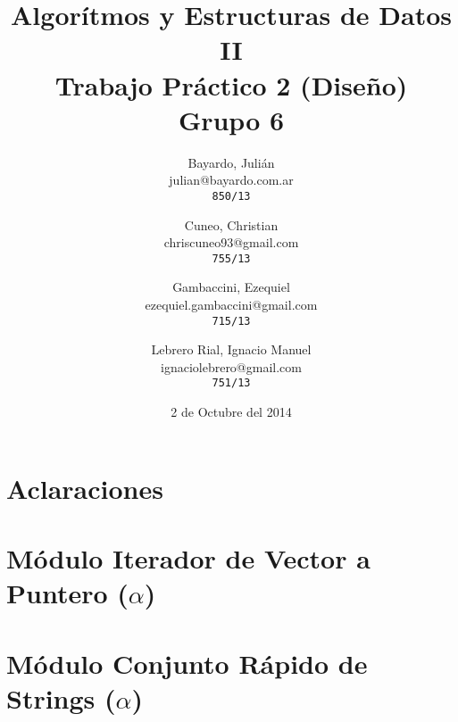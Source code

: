 \documentclass[a4paper,titlepage]{article}
\begin{document}
\title{Algorítmos y Estructuras de Datos II\\
Trabajo Práctico 2 (Diseño)\\
Grupo 6}

\author{
  Bayardo, Julián\\
  julian@bayardo.com.ar\\
  \texttt{850/13}
  \and
  Cuneo, Christian\\
  chriscuneo93@gmail.com\\
  \texttt{755/13}
  \and
  Gambaccini, Ezequiel\\
  ezequiel.gambaccini@gmail.com\\
  \texttt{715/13}
  \and
  Lebrero Rial, Ignacio Manuel\\
  ignaciolebrero@gmail.com\\
  \texttt{751/13}
}

\date{2 de Octubre del 2014}

\maketitle


\section{Aclaraciones}

\section{Módulo Iterador de Vector a Puntero ($\alpha$)}



\section{Módulo Conjunto Rápido de Strings ($\alpha$)}
\end{document}
